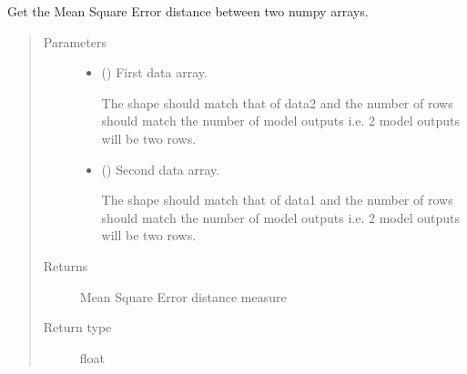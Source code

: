 \documentclass[letterpaper,10pt,english]{sphinxmanual}
\begin{document}
\begin{fulllineitems}
\label{\detokenize{abc:bayescmd.abc.distances.mean_square_error_dist}}
Get the Mean Square Error distance between two numpy arrays.
\begin{quote}\begin{description}
\item[{Parameters}] \leavevmode\begin{itemize}
\item {} 
 () \textendash{} 
First data array.

The shape should match that of data2 and the number of rows should
match the number of model outputs i.e. 2 model outputs will be two
rows.


\item {} 
 () \textendash{} 
Second data array.

The shape should match that of data1 and the number of rows should
match the number of model outputs i.e. 2 model outputs will be two
rows.


\end{itemize}

\item[{Returns}] \leavevmode
{} \textendash{} Mean Square Error distance measure

\item[{Return type}] \leavevmode
float

\end{description}\end{quote}

\end{fulllineitems}

\end{document}
